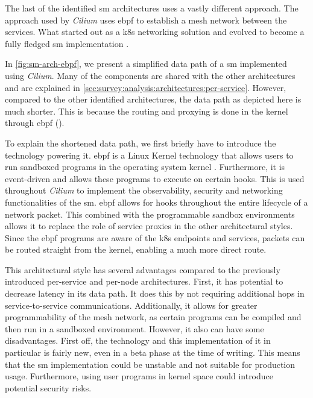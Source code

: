 The last of the identified \gls{sm} architectures uses a vastly different approach. The approach used by \textit{Cilium} uses \gls{ebpf} to establish a mesh network between the services. What started out as a \gls{k8s} networking solution and evolved to become a fully fledged \gls{sm} implementation \cite{cilium-mesh}. 

In \cref{fig:sm-arch-ebpf}, we present a simplified data path of a \gls{sm} implemented using \textit{Cilium}.  Many of the components are shared with the other architectures and are explained in \cref{sec:survey:analysis:architectures:per-service}. However, compared to the other identified architectures, the data path as depicted here is much shorter. This is because the routing and proxying is done in the kernel through \gls{ebpf} (). 

To explain the shortened data path, we first briefly have to introduce the technology powering it. \gls{ebpf} is a Linux Kernel technology that allows users to run sandboxed programs in the operating system kernel \cite{ebpf}. Furthermore, it is event-driven and allows these programs to execute on certain hooks. This is used throughout \textit{Cilium} to implement the observability, security and networking functionalities of the \gls{sm}. \gls{ebpf} allows for hooks throughout the entire lifecycle of a network packet. This combined with the programmable sandbox environments allows it to replace the role of service proxies in the other architectural styles. Since the \gls{ebpf} programs are aware of the \gls{k8s} endpoints and services, packets can be routed straight from the kernel, enabling a much more direct route.

This architectural style has several advantages compared to the previously introduced per-service and per-node architectures. First, it has potential to decrease latency in its data path. It does this by not requiring additional hops in service-to-service communications. Additionally, it allows for greater programmability of the mesh network, as certain programs can be compiled and then run in a sandboxed environment. However, it also can have some disadvantages. First off, the technology and this implementation of it in particular is fairly new, even in a beta phase at the time of writing. This means that the \gls{sm} implementation could be unstable and not suitable for production usage. Furthermore, using user programs in kernel space could introduce potential security risks. 


    
    


